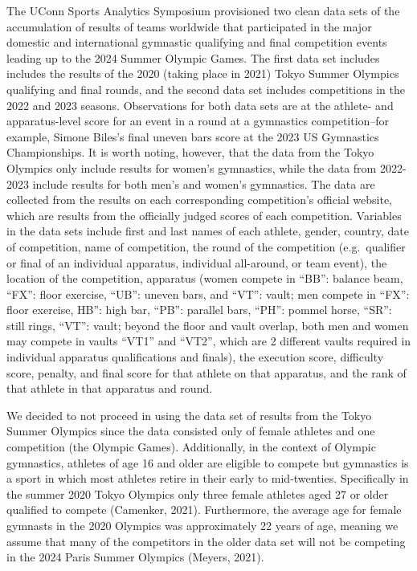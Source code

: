 \documentclass[
  letterpaper,
  DIV=11,
  numbers=noendperiod]{scrartcl}
\begin{document}
The UConn Sports Analytics Symposium provisioned two clean data sets of
the accumulation of results of teams worldwide that participated in the
major domestic and international gymnastic qualifying and final
competition events leading up to the 2024 Summer Olympic Games. The
first data set includes includes the results of the 2020 (taking place
in 2021) Tokyo Summer Olympics qualifying and final rounds, and the
second data set includes competitions in the 2022 and 2023 seasons.
Observations for both data sets are at the athlete- and apparatus-level
score for an event in a round at a gymnastics competition--for example,
Simone Biles's final uneven bars score at the 2023 US Gymnastics
Championships. It is worth noting, however, that the data from the Tokyo
Olympics only include results for women's gymnastics, while the data
from 2022-2023 include results for both men's and women's gymnastics.
The data are collected from the results on each corresponding
competition's official website, which are results from the officially
judged scores of each competition. Variables in the data sets include
first and last names of each athlete, gender, country, date of
competition, name of competition, the round of the competition
(e.g.~qualifier or final of an individual apparatus, individual
all-around, or team event), the location of the competition, apparatus
(women compete in ``BB'': balance beam, ``FX'': floor exercise, ``UB'':
uneven bars, and ``VT'': vault; men compete in ``FX'': floor exercise,
HB'': high bar, ``PB'': parallel bars, ``PH'': pommel horse, ``SR'':
still rings, ``VT'': vault; beyond the floor and vault overlap, both men
and women may compete in vaults ``VT1'' and ``VT2'', which are 2
different vaults required in individual apparatus qualifications and
finals), the execution score, difficulty score, penalty, and final score
for that athlete on that apparatus, and the rank of that athlete in that
apparatus and round.

We decided to not proceed in using the data set of results from the
Tokyo Summer Olympics since the data consisted only of female athletes
and one competition (the Olympic Games). Additionally, in the context of
Olympic gymnastics, athletes of age 16 and older are eligible to compete
but gymnastics is a sport in which most athletes retire in their early
to mid-twenties. Specifically in the summer 2020 Tokyo Olympics only
three female athletes aged 27 or older qualified to compete (Camenker,
2021). Furthermore, the average age for female gymnasts in the 2020
Olympics was approximately 22 years of age, meaning we assume that many
of the competitors in the older data set will not be competing in the
2024 Paris Summer Olympics (Meyers, 2021).
\end{document}
